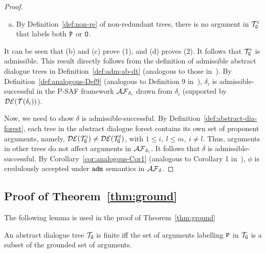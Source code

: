 \begin{proof}
\begin{enumerate} [a)]
      \item By Definition~\ref{def:non-re} of non-redundant trees, there is no argument in $\mathcal{T}_{\texttt{\textup{G}}}^{i}$ that labels both $\texttt{\textup{P}}$ or $\texttt{\textup{O}}$.
  \end{enumerate}

  It can be seen that (b) and (c) prove (1), and (d) proves (2). 
  It follows that $\mathcal{T}_{\texttt{\textup{G}}}^{i}$ is admissible. This result directly follows from the definition of admissible abstract dialogue trees in Definition~\ref{def:adm-ab-dt} (analogous to those in~\cite{loanho_2024}).  
  By Definition~\ref{def:analogous-Def9} (analogous to Definition 9 in~\cite{loanho_2024}), $\delta_i$ is admissible-successful in the P-SAF framework $\mathcal{AF}_{\delta_{i}}$ drawn from $\delta_i$ (supported by $\mathcal{DE}(\mathcal{T}(\delta_i))$).

  Now, we need to show $\delta$ is admissible-successful. By Definition~\ref{def:abstract-dia-forest}, each tree in the abstract dialogue forest contains its own set of proponent arguments, namely, $\mathcal{DE}(\mathcal{T}_{\texttt{\textup{G}}}^{i}) \neq \mathcal{DE}(\mathcal{T}_{\texttt{\textup{G}}}^{l})$, with $1 \leq i,\ l \leq m,\ i \neq l$. Thus, arguments in other trees do not affect arguments in $\mathcal{AF}_{\delta_{i}}$. It follows that $\delta$ is admissible-successful. 
  By Corollary~\ref{cor:analogous-Cor1} (analogous to Corollary 1 in~\cite{loanho_2024}), $\phi$ is credulously accepted under $\texttt{\textup{adm}}$ semantics in $\mathcal{AF}_{\delta}$.
\end{proof}


    

 \subsection{Proof of Theorem~\ref{thm:ground}}
The following lemma is used in the proof of Theorem~\ref{thm:ground}
\begin{lemma}
\label{lem:inf-groundedset}
   An abstract dialogue tree $\mathcal{T}_{\texttt{\textup{G}}}$ is finite iff the set of arguments labelling $\texttt{\textup{P}}$ in $\mathcal{T}_{\texttt{\textup{G}}}$ is a subset of the grounded set of arguments.
\end{lemma}

